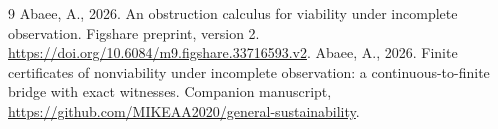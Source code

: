 \begin{thebibliography}{9}
 Abaee, A., 2026. An obstruction calculus for viability under incomplete observation. Figshare preprint, version 2. \url{https://doi.org/10.6084/m9.figshare.33716593.v2}.
 Abaee, A., 2026. Finite certificates of nonviability under incomplete observation: a continuous-to-finite bridge with exact witnesses. Companion manuscript, \url{https://github.com/MIKEAA2020/general-sustainability}.
\end{thebibliography}


